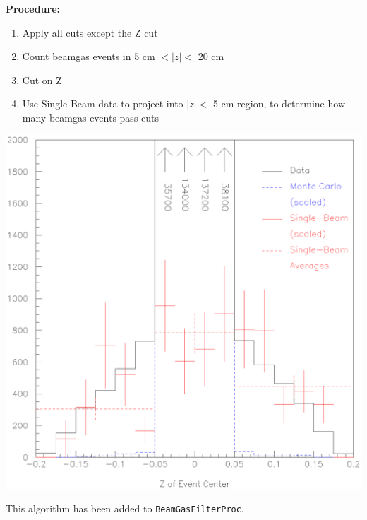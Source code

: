 \begin{slide*}

\slideframe{}
\huge
{}

\begin{minipage}[t]{\linewidth}
\large

{\bf Procedure:}
\begin{enumerate}

  \item Apply all cuts except the Z cut

  \item Count beamgas events in 5 cm $< |z| <$ 20 cm

  \item Cut on Z

  \item Use Single-Beam data to project into $|z| <$ 5 cm region, to
  determine how many beamgas events pass cuts

\end{enumerate}

\vspace{-0.5cm}

\begin{center}
  \includegraphics[width=0.85\linewidth]{determine_factor.eps}
\end{center}

This algorithm has been added to {\tt BeamGasFilterProc}.

\end{minipage}

\end{slide*}


